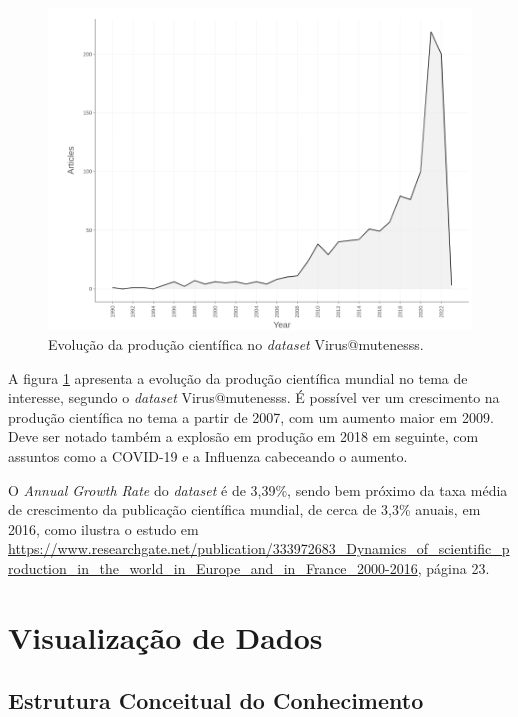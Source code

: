  \begin{figure}[htp]
     \centering
     \includegraphics[width=1\textwidth]{exploratory-data-analysis/mutenesss/Virus/20221128/img/AnualProd.png}
     \caption{Evolução da produção científica no \textit{dataset} Virus@mutenesss.}
     \label{fig:evol:anual:Virus@mutenesss}
 \end{figure}

A figura \ref{fig:evol:anual:Virus@mutenesss} apresenta a evolução da produção científica mundial no tema de interesse, segundo o \textit{dataset} Virus@mutenesss. É possível ver um crescimento na produção científica no tema a partir de 2007, com um aumento maior em 2009. Deve ser notado também a explosão em produção em 2018 em seguinte, com assuntos como a COVID-19 e a Influenza cabeceando o aumento.

O \textit{Annual Growth Rate} do \textit{dataset}   é de 3,39\%, sendo bem próximo da taxa média de crescimento da publicação científica mundial, de cerca de 3,3\% anuais, em 2016, como ilustra o estudo em \url{https://www.researchgate.net/publication/333972683_Dynamics_of_scientific_production_in_the_world_in_Europe_and_in_France_2000-2016}, página 23. 

\section{Visualização de Dados}\label{Virus@mutenesss:Data Visualization}

\subsection{Estrutura Conceitual do Conhecimento}

